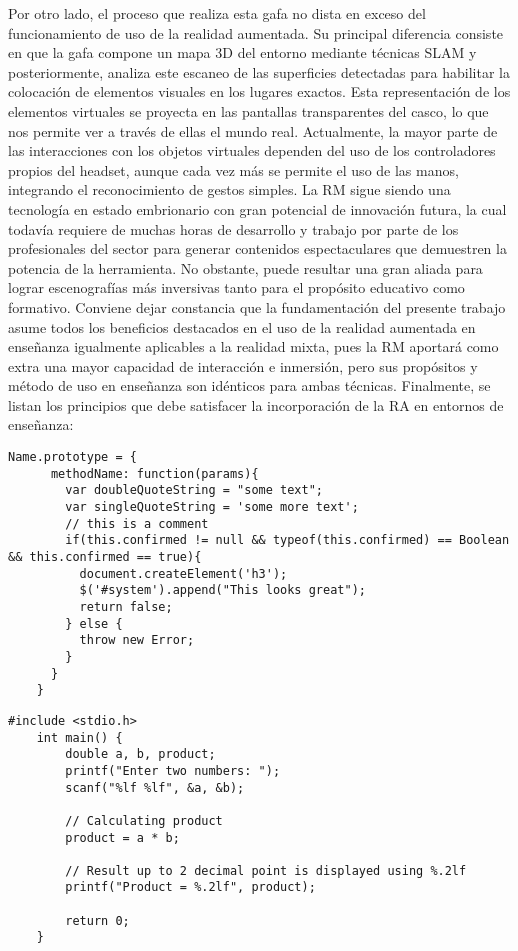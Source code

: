 Por otro lado, el proceso que realiza esta gafa no dista en exceso del funcionamiento de uso de la realidad aumentada. Su principal diferencia consiste en que la gafa compone un mapa 3D del entorno mediante técnicas SLAM y posteriormente, analiza este escaneo de las superficies detectadas para habilitar la colocación de elementos visuales en los lugares exactos. Esta representación de los elementos virtuales se proyecta en las pantallas transparentes del casco, lo que nos permite ver a través de ellas el mundo real. Actualmente, la mayor parte de las interacciones con los objetos virtuales dependen del uso de los controladores propios del headset, aunque cada vez más se permite el uso de las manos, integrando el reconocimiento de gestos simples.
La RM sigue siendo una tecnología en estado embrionario con gran potencial de innovación futura, la cual todavía requiere de muchas horas de desarrollo y trabajo por parte de los profesionales del sector para generar contenidos espectaculares que demuestren la potencia de la herramienta. No obstante, puede resultar una gran aliada para lograr escenografías más inversivas tanto para el propósito educativo como formativo.
Conviene dejar constancia que la fundamentación del presente trabajo asume todos los beneficios destacados en el uso de la realidad aumentada en enseñanza igualmente aplicables a la realidad mixta, pues la RM aportará como extra una mayor capacidad de interacción e inmersión, pero sus propósitos y método de uso en enseñanza son idénticos para ambas técnicas. Finalmente, se listan los principios que debe satisfacer la incorporación de la RA en entornos de enseñanza:

\begin{lstlisting}[caption=My Javascript Example]
    Name.prototype = {
      methodName: function(params){
        var doubleQuoteString = "some text";
        var singleQuoteString = 'some more text';
        // this is a comment
        if(this.confirmed != null && typeof(this.confirmed) == Boolean && this.confirmed == true){
          document.createElement('h3');
          $('#system').append("This looks great");
          return false;
        } else {
          throw new Error;
        }
      }
    }
\end{lstlisting}

\begin{lstlisting}[caption=My Javascript Example]
    #include <stdio.h>
    int main() {
        double a, b, product;
        printf("Enter two numbers: ");
        scanf("%lf %lf", &a, &b);  
     
        // Calculating product
        product = a * b;
    
        // Result up to 2 decimal point is displayed using %.2lf
        printf("Product = %.2lf", product);
        
        return 0;
    }
\end{lstlisting}

